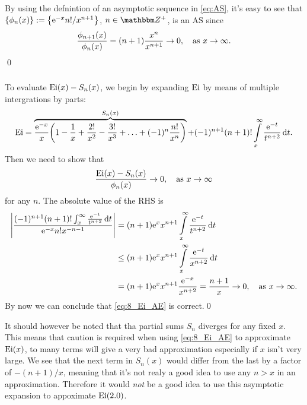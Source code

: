 \documentclass[11pt,letter, swedish, english
]{article}
\newcommand{\Ei}{\ensuremath\mathrm{Ei}}
\begin{document}
\setcounter{subsubsection}{0}
\renewcommand{\thesubsubsection}{\arabic{section} (\alph{subsection}\roman{subsubsection})}
\subsubsection{}%
By using the defnintion of an asymptotic sequence in \eqref{eq:AS},
it's easy to see that $\{\phi_n(x)\}:=\qty{\mathrm{e}^{-x}n!/x^{n+1}}$,
$n\in\Z^+$, is an AS since
\begin{equation}
\frac{\phi_{n+1}(x)}{\phi_n(x)}=(n+1)\frac{x^n}{x^{n+1}}\to0\as x\to\infty.
\end{equation}
\qed

\subsubsection{}
To evaluate $\Ei(x)-S_n(x)$, we begin by expanding $\Ei$ by means of
multiple intergrations by parts:
\begin{equation}
\Ei = \overbrace{\frac{\ee^{-x}}{x}
\qty(1-\frac{1}{x}+\frac{2!}{x^2}-\frac{3!}{x^3}+\ldots+(-1)^n\frac{n!}{x^n})
}^{S_n(x)}
+(-1)^{n+1} (n+1)! \int_x^\infty\frac{\ee^{-t}}{t^{n+2}}\id{t}.
\end{equation}
Then we need to show that
\begin{equation}
\frac{\Ei(x)-S_n(x)}{\phi_n(x)}\to0\as x\to\infty
\end{equation}
for any $n$. The absolute value of the RHS is
\begin{equation}
\begin{aligned}
\abs{\frac{(-1)^{n+1}(n+1)!\oldint_x^\infty\frac{\ee^{-t}}{t^{n+2}}\id{t}}
{\ee^{-x}n!x^{-n-1}}} &=
(n+1)\ee^{x}x^{n+1}\int_x^\infty\frac{\ee^{-t}}{t^{n+2}}\id{t}\\
&\le (n+1)\ee^{x}x^{n+1}\int_x^\infty\frac{\ee^{-t}}{x^{n+2}}\id{t}\\
&=(n+1)\ee^{x}x^{n+1}\frac{\ee^{-x}}{x^{n+2}} 
= \frac{n+1}{x}\to0\as x\to\infty.
\end{aligned}
\end{equation}
By now we can conclude that \eqref{eq:8_Ei_AE} is correct.\qed

It should however be noted that tha partial sums $S_n$ diverges for
any fixed $x$. This means that caution is required when using
\eqref{eq:8_Ei_AE} to approximate $\Ei(x)$, to many terms will give a
very bad approximation especially if $x$ isn't very large. We see that
the next term in $S_n(x)$ would differ from the last by a factor of
$-(n+1)/x$, meaning that it's not realy a good idea to use any $n>x$
in an approximation. Therefore it would \emph{not} be a good idea to
use this asymptotic expansion to appoximate $\Ei(2.0)$.
\end{document}
